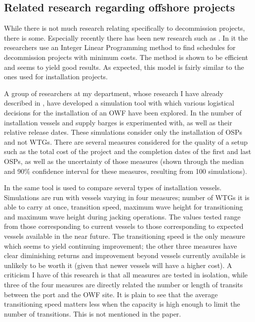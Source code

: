 \documentclass[a4paper,12pt]{article}
\begin{document}
\subsection{Related research regarding offshore projects} \label{ss:offsh}
While there is not much research relating specifically to decommission projects, there is some. Especially recently there has been new research such as \cite{irawan2019optimisation}. In it the researchers use an Integer Linear Programming method to find schedules for decommission projects with minimum costs. The method is shown to be efficient and seems to yield good results. As expected, this model is fairly similar to the ones used for installation projects. 

\bigskip

A group of researchers at my department, whose research \cite{barlow2018mixed} I have already described in , have developed a simulation tool with which various logistical decisions for the installation of an OWF have been explored. In \cite{barlow2014support} the number of installation vessels and supply barges is experimented with, as well as their relative release dates. These simulations consider only the installation of OSPs and not WTGs. There are several measures considered for the quality of a setup such as the total cost of the project and the completion dates of the first and last OSPs, as well as the uncertainty of those measures (shown through the median and 90\% confidence interval for these measures, resulting from 100 simulations). 

In \cite{barlow2014assessment} the same tool is used to compare several types of installation vessels. Simulations are run with vessels varying in four measures; number of WTGs it is able to carry at once, transition speed, maximum wave height for transitioning and maximum wave height during jacking operations. The values tested range from those corresponding to current vessels to those corresponding to expected vessels available in the near future. The transitioning speed is the only measure which seems to yield continuing improvement; the other three measures have clear diminishing returns and improvement beyond vessels currently available is unlikely to be worth it (given that newer vessels will have a higher cost). A criticism I have of this research is that all measures are tested in isolation, while three of the four measures are directly related the number or length of transits between the port and the OWF site. It is plain to see that the average transitioning speed matters less when the capacity is high enough to limit the number of transitions. This is not mentioned in the paper.
\end{document}

